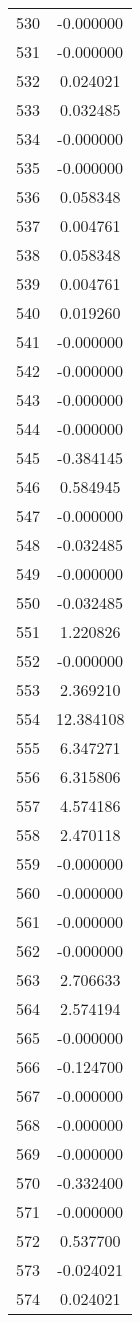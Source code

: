 \documentclass[12pt]{article}
\begin{document}
\begin{longtable}{@{}cc@{}}
530 & -0.000000 \\
531 & -0.000000 \\
532 & 0.024021 \\
533 & 0.032485 \\
534 & -0.000000 \\
535 & -0.000000 \\
536 & 0.058348 \\
537 & 0.004761 \\
538 & 0.058348 \\
539 & 0.004761 \\
540 & 0.019260 \\
541 & -0.000000 \\
542 & -0.000000 \\
543 & -0.000000 \\
544 & -0.000000 \\
545 & -0.384145 \\
546 & 0.584945 \\
547 & -0.000000 \\
548 & -0.032485 \\
549 & -0.000000 \\
550 & -0.032485 \\
551 & 1.220826 \\
552 & -0.000000 \\
553 & 2.369210 \\
554 & 12.384108 \\
555 & 6.347271 \\
556 & 6.315806 \\
557 & 4.574186 \\
558 & 2.470118 \\
559 & -0.000000 \\
560 & -0.000000 \\
561 & -0.000000 \\
562 & -0.000000 \\
563 & 2.706633 \\
564 & 2.574194 \\
565 & -0.000000 \\
566 & -0.124700 \\
567 & -0.000000 \\
568 & -0.000000 \\
569 & -0.000000 \\
570 & -0.332400 \\
571 & -0.000000 \\
572 & 0.537700 \\
573 & -0.024021 \\
574 & 0.024021 \\

\end{longtable}
\end{document}
